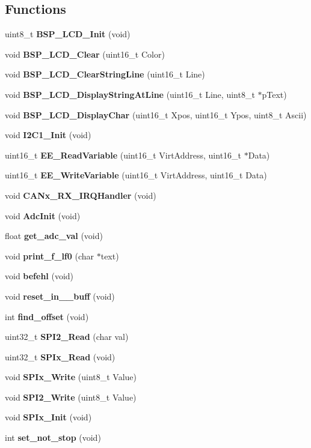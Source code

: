 \subsection*{Functions}
\begin{DoxyCompactItemize}
\item 
uint8\+\_\+t \textbf{ B\+S\+P\+\_\+\+L\+C\+D\+\_\+\+Init} (void)
\item 
void \textbf{ B\+S\+P\+\_\+\+L\+C\+D\+\_\+\+Clear} (uint16\+\_\+t Color)
\item 
void \textbf{ B\+S\+P\+\_\+\+L\+C\+D\+\_\+\+Clear\+String\+Line} (uint16\+\_\+t Line)
\item 
void \textbf{ B\+S\+P\+\_\+\+L\+C\+D\+\_\+\+Display\+String\+At\+Line} (uint16\+\_\+t Line, uint8\+\_\+t $\ast$p\+Text)
\item 
void \textbf{ B\+S\+P\+\_\+\+L\+C\+D\+\_\+\+Display\+Char} (uint16\+\_\+t Xpos, uint16\+\_\+t Ypos, uint8\+\_\+t Ascii)
\item 
void \textbf{ I2\+C1\+\_\+\+Init} (void)
\item 
uint16\+\_\+t \textbf{ E\+E\+\_\+\+Read\+Variable} (uint16\+\_\+t Virt\+Address, uint16\+\_\+t $\ast$Data)
\item 
uint16\+\_\+t \textbf{ E\+E\+\_\+\+Write\+Variable} (uint16\+\_\+t Virt\+Address, uint16\+\_\+t Data)
\item 
void \textbf{ C\+A\+Nx\+\_\+\+R\+X\+\_\+\+I\+R\+Q\+Handler} (void)
\item 
void \textbf{ Adc\+Init} (void)
\item 
float \textbf{ get\+\_\+adc\+\_\+val} (void)
\item 
void \textbf{ print\+\_\+f\+\_\+lf0} (char $\ast$text)
\item 
void \textbf{ befehl} (void)
\item 
void \textbf{ reset\+\_\+in\+\_\+\_\+buff} (void)
\item 
int \textbf{ find\+\_\+offset} (void)
\item 
uint32\+\_\+t \textbf{ S\+P\+I2\+\_\+\+Read} (char val)
\item 
uint32\+\_\+t \textbf{ S\+P\+Ix\+\_\+\+Read} (void)
\item 
void \textbf{ S\+P\+Ix\+\_\+\+Write} (uint8\+\_\+t Value)
\item 
void \textbf{ S\+P\+I2\+\_\+\+Write} (uint8\+\_\+t Value)
\item 
void \textbf{ S\+P\+Ix\+\_\+\+Init} (void)
\item 
int \textbf{ set\+\_\+not\+\_\+stop} (void)
\item 

\end{DoxyCompactItemize}
